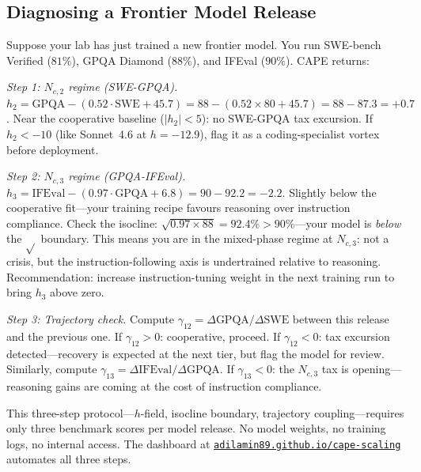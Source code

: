 \documentclass[11pt]{article}
\begin{document}
\subsection{Diagnosing a Frontier Model Release}

Suppose your lab has just trained a new frontier model. You run SWE-bench Verified ($81\%$), GPQA Diamond ($88\%$), and IFEval ($90\%$). CAPE returns:

\medskip
\noindent\textit{Step 1: $N_{c,2}$ regime (SWE-GPQA).}
$h_2 = \text{GPQA} - (0.52\cdot\text{SWE} + 45.7) = 88 - (0.52 \times 80 + 45.7) = 88 - 87.3 = +0.7$. Near the cooperative baseline ($|h_2| < 5$): no SWE-GPQA tax excursion. If $h_2 < -10$ (like Sonnet~4.6 at $h=-12.9$), flag it as a coding-specialist vortex before deployment.

\medskip
\noindent\textit{Step 2: $N_{c,3}$ regime (GPQA-IFEval).}
$h_3 = \text{IFEval} - (0.97\cdot\text{GPQA} + 6.8) = 90 - 92.2 = -2.2$. Slightly below the cooperative fit---your training recipe favours reasoning over instruction compliance. Check the isocline: $\sqrt{0.97 \times 88} = 92.4\% > 90\%$---your model is \emph{below} the $\sqrt{}$ boundary. This means you are in the mixed-phase regime at $N_{c,3}$: not a crisis, but the instruction-following axis is undertrained relative to reasoning. Recommendation: increase instruction-tuning weight in the next training run to bring $h_3$ above zero.

\medskip
\noindent\textit{Step 3: Trajectory check.}
Compute $\gamma_{12} = \Delta\text{GPQA}/\Delta\text{SWE}$ between this release and the previous one. If $\gamma_{12} > 0$: cooperative, proceed. If $\gamma_{12} < 0$: tax excursion detected---recovery is expected at the next tier, but flag the model for review. Similarly, compute $\gamma_{13} = \Delta\text{IFEval}/\Delta\text{GPQA}$. If $\gamma_{13} < 0$: the $N_{c,3}$ tax is opening---reasoning gains are coming at the cost of instruction compliance.

\medskip
\noindent This three-step protocol---$h$-field, isocline boundary, trajectory coupling---requires only three benchmark scores per model release.
No model weights, no training logs, no internal access.
The dashboard at \href{https://adilamin89.github.io/cape-scaling}{\texttt{adilamin89.github.io/cape-scaling}} automates all three steps.
\end{document}
